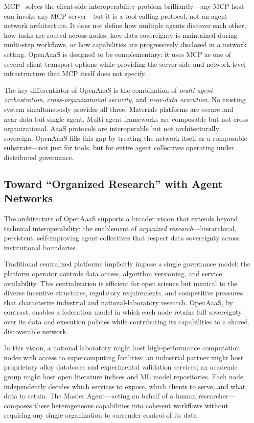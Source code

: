 \documentclass{article}
\begin{document}
MCP~\cite{anthropic2024mcp,hou2025} solves the client-side interoperability problem brilliantly---any MCP host can invoke any MCP server---but it is a tool-calling protocol, not an agent-network architecture. It does not define how multiple agents discover each other, how tasks are routed across nodes, how data sovereignty is maintained during multi-step workflows, or how capabilities are progressively disclosed in a network setting. OpenAaaS is designed to be complementary: it uses MCP as one of several client transport options while providing the server-side and network-level infrastructure that MCP itself does not specify.

The key differentiator of OpenAaaS is the combination of \textit{multi-agent orchestration}, \textit{cross-organizational security}, and \textit{near-data execution}. No existing system simultaneously provides all three. Materials platforms are secure and near-data but single-agent. Multi-agent frameworks are composable but not cross-organizational. AaaS protocols are interoperable but not architecturally sovereign. OpenAaaS fills this gap by treating the network itself as a composable substrate---not just for tools, but for entire agent collectives operating under distributed governance.

\subsection{Toward ``Organized Research'' with Agent Networks}

The architecture of OpenAaaS supports a broader vision that extends beyond technical interoperability: the enablement of \textit{organized research}---hierarchical, persistent, self-improving agent collectives that respect data sovereignty across institutional boundaries.

Traditional centralized platforms implicitly impose a single governance model: the platform operator controls data access, algorithm versioning, and service availability. This centralization is efficient for open science but inimical to the diverse incentive structures, regulatory requirements, and competitive pressures that characterize industrial and national-laboratory research. OpenAaaS, by contrast, enables a federation model in which each node retains full sovereignty over its data and execution policies while contributing its capabilities to a shared, discoverable network.

In this vision, a national laboratory might host high-performance computation nodes with access to supercomputing facilities; an industrial partner might host proprietary alloy databases and experimental validation services; an academic group might host open literature indices and ML model repositories. Each node independently decides which services to expose, which clients to serve, and what data to retain. The Master Agent---acting on behalf of a human researcher---composes these heterogeneous capabilities into coherent workflows without requiring any single organization to surrender control of its data.
\end{document}
